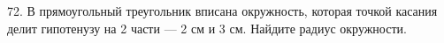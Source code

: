 72. В прямоугольный треугольник вписана окружность, которая точкой касания делит гипотенузу на 2 части --- 2 см и 3 см. Найдите радиус окружности.\\
